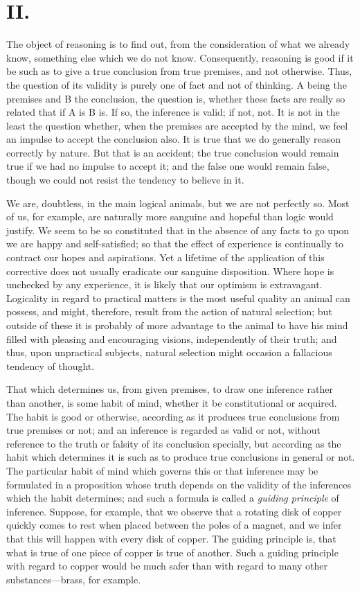 \section*{II.}

The object of reasoning is to find out, from the consideration of what
we already know, something else which we do not know. Consequently,
reasoning is good if it be such as to give a true conclusion from true
premises, and not otherwise. Thus, the question of its validity is
purely one of fact and not of thinking. A being the premises and B the
conclusion, the question is, whether these facts are really so related
that if A is B is. If so, the inference is valid; if not, not. It is
not in the least the question whether, when the premises are accepted
by the mind, we feel an impulse to accept the conclusion also. It is
true that we do generally reason correctly by nature. But that is an
accident; the true conclusion would remain true if we had no impulse
to accept it; and the false one would remain false, though we could
not resist the tendency to believe in it.

We are, doubtless, in the main logical animals, but we are not
perfectly so. Most of us, for example, are naturally more sanguine and
hopeful than logic would justify. We seem to be so constituted that in
the absence of any facts to go upon we are happy and self-satisfied;
so that the effect of experience is continually to contract our hopes
and aspirations. Yet a lifetime of the application of this corrective
does not usually eradicate our sanguine disposition. Where hope is
unchecked by any experience, it is likely that our optimism is
extravagant. Logicality in regard to practical matters is the most
useful quality an animal can possess, and might, therefore, result
from the action of natural selection; but outside of these it is
probably of more advantage to the animal to have his mind filled
with pleasing and encouraging visions, independently of their truth;
and thus, upon unpractical subjects, natural selection might occasion
a fallacious tendency of thought.

That which determines us, from given premises, to draw one
inference rather than another, is some habit of mind, whether it be
constitutional or acquired. The habit is good or otherwise, according
as it produces true conclusions from true premises or not; and an
inference is regarded as valid or not, without reference to the truth
or falsity of its conclusion specially, but according as the habit
which determines it is such as to produce true conclusions in general
or not. The particular habit of mind which governs this or that
inference may be formulated in a proposition whose truth depends on
the validity of the inferences which the habit determines; and such a
formula is called a \textit{guiding principle} of inference. Suppose,
for example, that we observe that a rotating disk of copper quickly
comes to rest when placed between the poles of a magnet, and we infer
that this will happen with every disk of copper. The guiding principle
is, that what is true of one piece of copper is true of another. Such
a guiding principle with regard to copper would be much safer than
with regard to many other sub\-stanc\-es---brass, for example.

